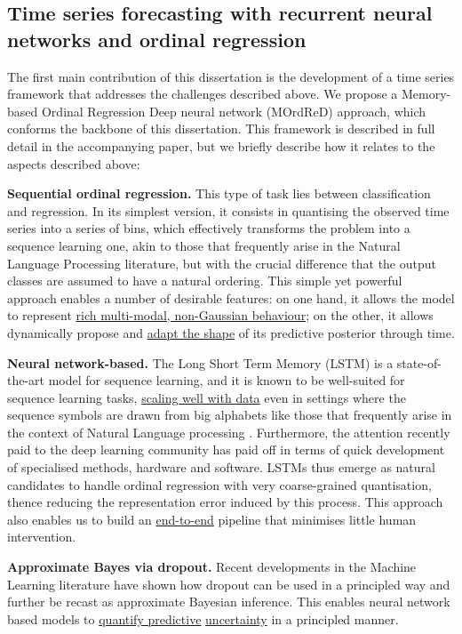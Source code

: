 \documentclass[pdftex,12pt,a4paper]{article}
\theoremstyle{definition}
\theoremstyle{remark}
\begin{document}
\subsection{Time series forecasting with recurrent neural networks and ordinal regression}
The first main contribution of this dissertation is the development of a time series framework that addresses the challenges described above. We propose a Memory-based Ordinal Regression Deep neural network (MOrdReD) approach, which conforms the backbone of this dissertation. This framework is described in full detail in the accompanying paper, but we briefly describe how it relates to the aspects described above:

\textbf{Sequential ordinal regression.} This type of task lies between classification and regression. In its simplest version, it consists in quantising the observed time series into a series of bins, which effectively transforms the problem into a sequence learning one, akin to those that frequently arise in the Natural Language Processing literature, but with the crucial difference that the output classes are assumed to have a natural ordering. This simple yet powerful approach enables a number of desirable features: on one hand, it allows the model to represent \underline{rich multi-modal, non-Gaussian behaviour}; on the other, it allows dynamically propose and \underline{adapt the shape} of its predictive posterior through time.

\textbf{Neural network-based.} The Long Short Term Memory (LSTM) is a state-of-the-art model for sequence learning, and it is known to be well-suited for sequence learning tasks, \underline{scaling well with data} even in settings where the sequence symbols are drawn from big alphabets like those that frequently arise in the context of Natural Language processing \citep{Sutskever2014,Xu2014,graves2005}. Furthermore, the attention recently paid to the deep learning community has paid off in terms of quick development of specialised methods, hardware and software. LSTMs thus emerge as natural candidates to handle ordinal regression with very coarse-grained quantisation, thence reducing the representation error induced by this process. This approach also enables us to build an \underline{end-to-end} pipeline that minimises little human intervention.

\textbf{Approximate Bayes via dropout.} Recent developments in the Machine Learning literature have shown how dropout \citep{srivastava2014dropout} can be used in a principled way and further be recast as approximate Bayesian inference. This enables neural network based models to \underline{quantify predictive} \underline{uncertainty} in a principled manner.
\end{document}
